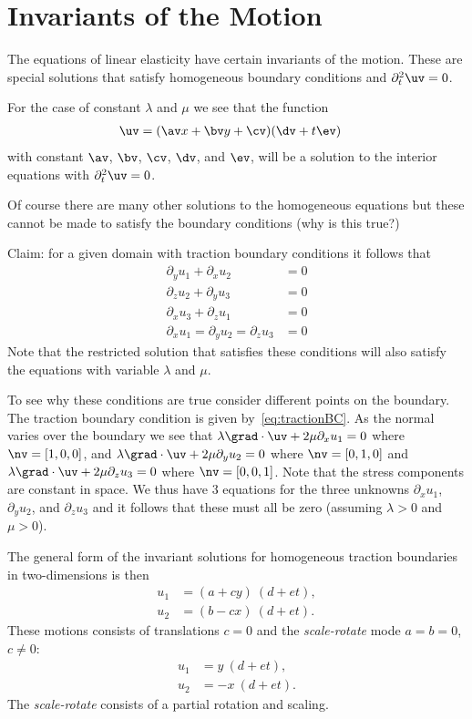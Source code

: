 \section{Invariants of the Motion}

The equations of linear elasticity have certain invariants of the motion.
These are special solutions that satisfy homogeneous boundary
conditions and $\partial_t^2\uv=0$.

For the case of constant $\lambda$ and $\mu$ we see that the function
\begin{align*}
   \uv &= (\av x + \bv y + \cv )( \dv + t \ev )
\end{align*}
with constant $\av$, $\bv$, $\cv$, $\dv$, and $\ev$, 
will be a solution to the interior equations with $\partial_t^2\uv=0$.

Of course there are many other solutions to the homogeneous equations
but these cannot be made to satisfy the boundary conditions (why is this
true?)



Claim: for a given domain with traction boundary conditions it follows that 
\begin{align}
  \partial_y u_1 + \partial_x u_2 &=0 \\
  \partial_z u_2 + \partial_y u_3 &=0 \\
  \partial_x u_3 + \partial_z u_1 &=0 \\
  \partial_x u_1 =  \partial_y u_2 = \partial_z u_3 &=0 
\end{align}
Note that the restricted solution that satisfies these
conditions will also satisfy the equations with variable $\lambda$
and $\mu$. 

To see why these conditions are true consider different points on the boundary.
The traction boundary condition is given by~\eqref{eq:tractionBC}.
 As the normal varies
over the boundary we see that $\lambda\grad\cdot\uv+2\mu \partial_x u_1 =0$ where $\nv=[1,0,0]$,
and $\lambda\grad\cdot\uv+2\mu \partial_y u_2 =0$ where  $\nv=[0,1,0]$ and $\lambda\grad\cdot\uv+2\mu \partial_z u_3=0$
where $\nv=[0,0,1]$. Note that the stress components are constant in space. We thus have 3 equations
for the three unknowns $\partial_x u_1$,  $\partial_y u_2$, and  $\partial_z u_3$ and  it follows that 
these must all be zero (assuming $\lambda>0$ and $\mu>0$).


The general form of the invariant solutions for homogeneous traction
boundaries in two-dimensions is then
\begin{align*}
   u_1 &= (a + cy)~(d+et),\\
   u_2 &= (b - cx)~(d+et) .
\end{align*}
These motions consists of translations $c=0$ and the {\em scale-rotate} mode $a=b=0$, $c\ne 0$:
\begin{align*}
   u_1 &=  y~(d+et),\\
   u_2 &= -x~(d+et) .
\end{align*}
The {\em scale-rotate} consists of a partial rotation and scaling. 


